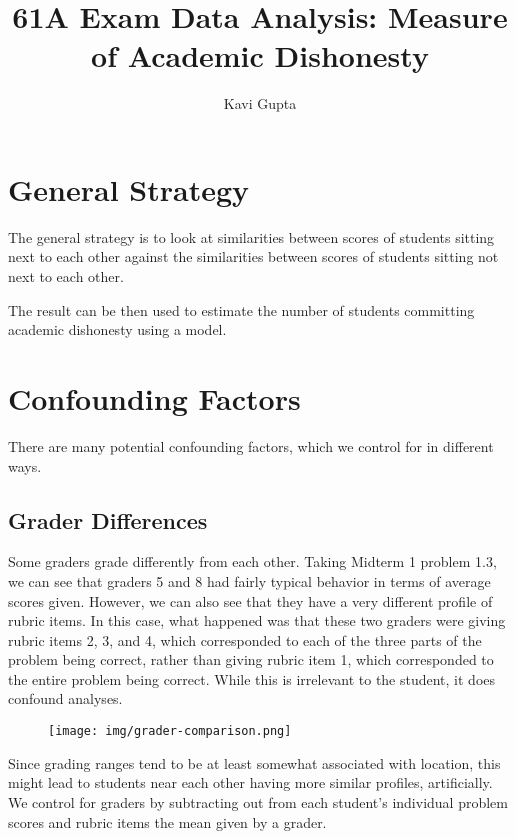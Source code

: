 \documentclass{article}
\begin{document}
    \author{Kavi Gupta}
    \title{61A Exam Data Analysis: Measure of Academic Dishonesty}
    \maketitle

\section{General Strategy}
    The general strategy is to look at similarities between scores of students sitting next to each
        other against the similarities between scores of students sitting not next to each other.
    
    The result can be then used to estimate the number of students committing academic dishonesty
        using a model.

\section{Confounding Factors}
    There are many potential confounding factors, which we control for in different ways.
    \subsection{Grader Differences}
        Some graders grade differently from each other. Taking Midterm 1 problem 1.3, we can see that
            graders 5 and 8 had fairly typical behavior in terms of average scores given. However, we can
            also see that they have a very different profile of rubric items. In this case, what happened
            was that these two graders were giving rubric items 2, 3, and 4, which corresponded to each of
            the three parts of the problem being correct, rather than giving rubric item 1, which
            corresponded to the entire problem being correct. While this is irrelevant to the student, it
            does confound analyses.

        \begin{figure}[h!]
            \centering
            \texttt{[image: img/grader-comparison.png]}
        \end{figure}

        Since grading ranges tend to be at least somewhat associated with location, this might lead to
            students near each other having more similar profiles, artificially. We control for graders
            by subtracting out from each student's individual problem scores and rubric items the mean
            given by a grader.
            
\end{document}
